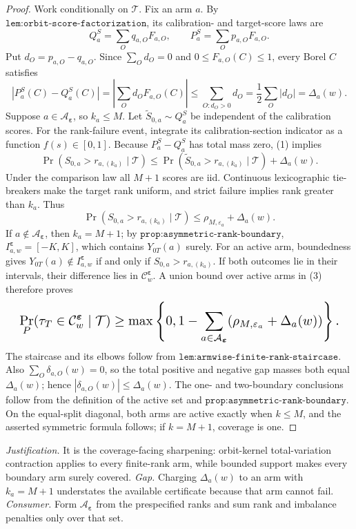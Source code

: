 \documentclass{article}
\begin{document}
\begin{proof}
Work conditionally on \(\mathcal T\). Fix an arm \(a\). By \(\texttt{lem:orbit-score-factorization}\), its calibration- and target-score laws are \[Q_a^S=\sum_Oq_{a,O}F_{a,O},\qquad P_a^S=\sum_Op_{a,O}F_{a,O}.\] Put \(d_O=p_{a,O}-q_{a,O}\). Since \(\sum_Od_O=0\) and \(0\le F_{a,O}(C)\le1\), every Borel \(C\) satisfies \[|P_a^S(C)-Q_a^S(C)|=|\sum_Od_OF_{a,O}(C)|\le\sum_{O:d_O>0}d_O=\frac12\sum_O|d_O|=\Delta_a(w).\tag{1}\] Suppose \(a\in\mathcal A_{\boldsymbol\varepsilon}\), so \(k_a\le M\). Let \(\widetilde S_{0,a}\sim Q_a^S\) be independent of the calibration scores. For the rank-failure event, integrate its calibration-section indicator as a function \(f(s)\in[0,1]\). Because \(P_a^S-Q_a^S\) has total mass zero, (1) implies \[\Pr(S_{0,a}>r_{a,(k_a)}\mid\mathcal T)\le\Pr(\widetilde S_{0,a}>r_{a,(k_a)}\mid\mathcal T)+\Delta_a(w).\tag{2}\] Under the comparison law all \(M+1\) scores are iid. Continuous lexicographic tie-breakers make the target rank uniform, and strict failure implies rank greater than \(k_a\). Thus \[\Pr(S_{0,a}>r_{a,(k_a)}\mid\mathcal T)\le\rho_{M,\varepsilon_a}+\Delta_a(w).\tag{3}\] If \(a\notin\mathcal A_{\boldsymbol\varepsilon}\), then \(k_a=M+1\); by \(\texttt{prop:asymmetric-rank-boundary}\), \(I^{\boldsymbol\varepsilon}_{a,w}=[-K,K]\), which contains \(Y_{0T}(a)\) surely.
For an active arm, boundedness gives \(Y_{0T}(a)\notin I^{\boldsymbol\varepsilon}_{a,w}\) if and only if \(S_{0,a}>r_{a,(k_a)}\). If both outcomes lie in their intervals, their difference lies in \(\mathcal C^{\boldsymbol\varepsilon}_w\). A union bound over active arms in (3) therefore proves \[
\makebox[\linewidth][c]{\resizebox{0.98\linewidth}{!}{\par\noindent \makebox[\linewidth][c]{\resizebox{0.98\linewidth}{!}{\(\displaystyle \displaystyle \Pr_P(\tau_T\in\mathcal C^{\boldsymbol\varepsilon}_w\mid\mathcal T)\ge\max\left\{0,1-\sum_{a\in\mathcal A_{\boldsymbol\varepsilon}}(\rho_{M,\varepsilon_a}+\Delta_a(w))\right\}.\)}}\par\noindent}}
\] The staircase and its elbows follow from \(\texttt{lem:armwise-finite-rank-staircase}\). Also \(\sum_O\delta_{a,O}(w)=0\), so the total positive and negative gap masses both equal \(\Delta_a(w)\); hence \(|\delta_{a,O}(w)|\le\Delta_a(w)\). The one- and two-boundary conclusions follow from the definition of the active set and \(\texttt{prop:asymmetric-rank-boundary}\). On the equal-split diagonal, both arms are active exactly when \(k\le M\), and the asserted symmetric formula follows; if \(k=M+1\), coverage is one.
\end{proof}
\par\smallskip\noindent \textit{Justification.} It is the coverage-facing sharpening: orbit-kernel total-variation contraction applies to every finite-rank arm, while bounded support makes every boundary arm surely covered. \textit{Gap.} Charging \(\Delta_a(w)\) to an arm with \(k_a=M+1\) understates the available certificate because that arm cannot fail. \textit{Consumer.} Form \(\mathcal A_{\boldsymbol\varepsilon}\) from the prespecified ranks and sum rank and imbalance penalties only over that set.
\end{document}
